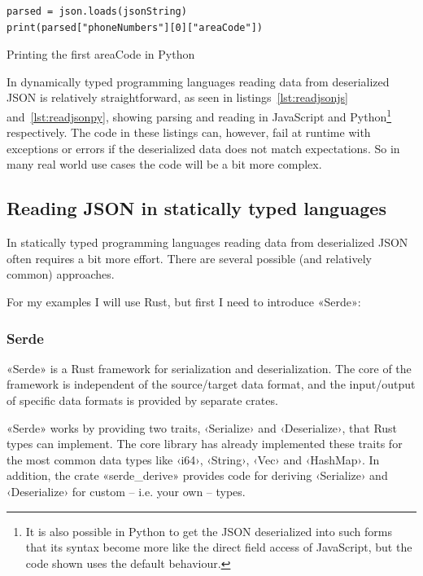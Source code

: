 \begin{listing}[ht!]
\begin{verbatim}
parsed = json.loads(jsonString)
print(parsed["phoneNumbers"][0]["areaCode"])
\end{verbatim}
\caption{Printing the first areaCode in Python}
\label{lst:readjsonpy}
\end{listing}

In dynamically typed programming languages reading data from deserialized JSON is relatively straightforward, as seen in listings~\ref{lst:readjsonjs} and~\ref{lst:readjsonpy}, showing parsing and reading in JavaScript and Python\footnote{It is also possible in Python to get the JSON deserialized into such forms that its syntax become more like the direct field access of JavaScript, but the code shown uses the default behaviour.} respectively. The code in these listings can, however, fail at runtime with exceptions or errors if the deserialized data does not match expectations. So in many real world use cases the code will be a bit more complex.

\subsection{Reading JSON in statically typed languages}

In statically typed programming languages reading data from deserialized JSON often requires a bit more effort. There are several possible (and relatively common) approaches.

For my examples I will use Rust, but first I need to introduce «Serde»:

\subsubsection{Serde}
\label{sec:serde}

«Serde» is a Rust framework for serialization and deserialization. The core of the framework is independent of the source/target data format, and the input/output of specific data formats is provided by separate crates.

«Serde» works by providing two traits, ‹Serialize› and ‹Deserialize›, that Rust types can implement. The core library has already implemented these traits for the most common data types like ‹i64›, ‹String›, ‹Vec› and ‹HashMap›. In addition, the crate «serde_derive» provides code for deriving ‹Serialize› and ‹Deserialize› for custom -- i.e. your own -- types.

